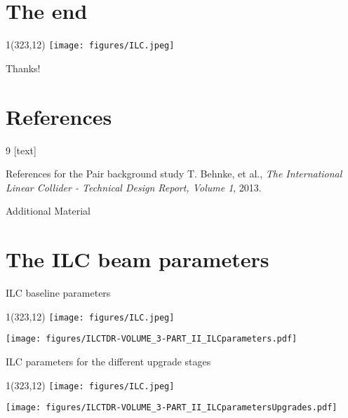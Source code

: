\documentclass[xcolor={dvipsnames}]{beamer}
\newcommand{\ilclogo}{
  \setlength{\TPHorizModule}{1pt}
  \setlength{\TPVertModule}{1pt}
  \begin{textblock}{1}(323,12)
   \texttt{[image: figures/ILC.jpeg]}
  \end{textblock}
}
\begin{document}

\section*{The end}
{
\begin{frame}
\ilclogo
\begin{center}
\textcolor{RubineRed}{
	\LARGE Thanks!\\
}
\end{center}
\end{frame}
}

\section*{References}
\begin{thebibliography}{9}
[text]
\begin{frame}{References for the Pair background study}
\tiny
{}
 T. Behnke, et al., \emph{The International Linear Collider - Technical Design Report, Volume 1}, 2013.
\end{frame}
\end{thebibliography}

\appendix

\begin{frame}
\begin{center}
\LARGE Additional Material
\end{center}
\end{frame}

\section{The ILC beam parameters}
\begin{frame}{ILC baseline parameters}
\ilclogo
\begin{center}
	\texttt{[image: figures/ILCTDR-VOLUME\_3-PART\_II\_ILCparameters.pdf]}
\end{center}
\end{frame}
\begin{frame}{ILC parameters for the different upgrade stages}
\ilclogo
\begin{center}
	\texttt{[image: figures/ILCTDR-VOLUME\_3-PART\_II\_ILCparametersUpgrades.pdf]}
\end{center}
\end{frame}
\end{document}
